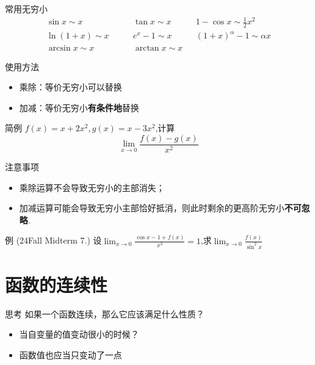\documentclass[]{beamer}
\begin{document}
\begin{frame}{常用无穷小}
    \[
    \begin{array}{lll}
        \sin x\sim x\qquad&\tan x\sim x\qquad& 1-\cos x\sim\frac12 x^2\\
        \ln(1+x)\sim x\qquad&e^x-1\sim x\qquad&(1+x)^\alpha -1 \sim \alpha x\\
        \arcsin x\sim x\qquad&\arctan x\sim x
    \end{array}
    \]
    
\end{frame}


\begin{frame}{使用方法}
    \begin{itemize}
        \item 乘除：等价无穷小可以替换
        \item 加减：等价无穷小\textbf{有条件地}替换
    \end{itemize}
\end{frame}

\begin{frame}{简例}
    $f(x)=x+2x^2,g(x)=x-3x^2$,计算
    \[
    \lim_{x\rightarrow 0}\frac{f(x)-g(x)}{x^2}
    \]
\end{frame}

\begin{frame}{注意事项}
    \begin{itemize}
        \item 乘除运算不会导致无穷小的主部消失；
        \item 加减运算可能会导致无穷小主部恰好抵消，则此时剩余的更高阶无穷小\textbf{不可忽略}.
    \end{itemize}
\end{frame}

\begin{frame}{例 (24Fall Midterm 7.)}
    设$\displaystyle\lim_{x\rightarrow0}\frac{\cos x - 1 + f(x)}{x^3}=1$,求$\displaystyle\lim_{x\rightarrow0}\frac{f(x)}{\sin^2x}$
\end{frame}

\section{函数的连续性}

\begin{frame}{思考}
    如果一个函数连续，那么它应该满足什么性质？
    \begin{itemize}
        \item 当自变量的值变动很小的时候？
        \item 函数值也应当只变动了一点
    \end{itemize}
\end{frame}
\end{document}
